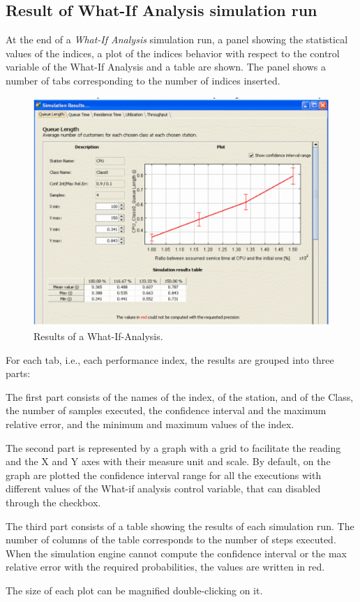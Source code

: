 \subsection{Result of What-If Analysis simulation run}
At the end of a \emph{What-If Analysis} simulation run, a panel
showing the statistical values of the indices, a plot of the
indices behavior with respect to the control variable of the
What-If Analysis and a table are shown. The panel shows a number
of tabs
corresponding to the number of indices inserted.\\
\begin{figure}[htb]
    \begin{center}
        \includegraphics[scale=.5]{img/jsimg/11.3.eps}
    \end{center}
    \caption{Results of a What-If-Analysis.}
    \label{fig:reswia}
\end{figure}
For each tab, i.e., each performance index, the results are
grouped into three parts:
\begin{itemize*}
\item  The first part consists of the names of the index, of the
station, and of the Class, the number of samples executed, the
confidence interval and the maximum relative error, and the
minimum and maximum values of the index.

\item   The second part is represented by a graph with a grid to
facilitate the reading and the X and Y axes with their measure
unit and scale. By default, on the graph are plotted the
confidence interval range for all the executions with different
values of the What-if analysis control variable, that can disabled
through the checkbox.

\item  The third part consists of a table showing the results of
each simulation run. The number of columns of the table
corresponds to the number of steps executed. When the simulation
engine cannot compute the confidence interval or the max relative
error with the required probabilities, the values are written in
red.
\end{itemize*}
The size of each plot can be magnified double-clicking on it.

